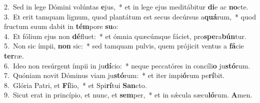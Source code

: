 {2.~}Sed in lege Dómini volúntas \textbf{e}jus,~* et in lege ejus meditábitur \textbf{di}e ac \textbf{no}cte.\\
{3.~}Et erit tamquam lignum, quod plantátum est secus decúrsus a\textbf{quá}rum,~* quod fructum suum dabit in \textbf{tém}pore \textbf{su}o:\\
{4.~}Et fólium ejus non \textbf{dé}fluet:~* et ómnia quæcúmque fáciet, pro\textbf{spe}ra\textbf{bún}tur.\\
{5.~}Non sic ímpii, \textbf{non} sic:~* sed tamquam pulvis, quem prójicit ventus a \textbf{fá}cie \textbf{ter}ræ.\\
{6.~}Ideo non resúrgent ímpii in ju\textbf{dí}cio:~* neque peccatóres in concíli\textbf{o} ju\textbf{stó}rum.\\
{7.~}Quóniam novit Dóminus viam ju\textbf{stó}rum:~* et iter impi\textbf{ó}rum pe\textbf{rí}bit.\\
{8.~}Glória Patri, et \textbf{Fí}lio,~* et Spi\textbf{rí}tui \textbf{San}cto.\\
{9.~}Sicut erat in princípio, et nunc, et \textbf{sem}per,~* et in sǽcula sæcu\textbf{ló}rum. \textbf{A}men.\\
